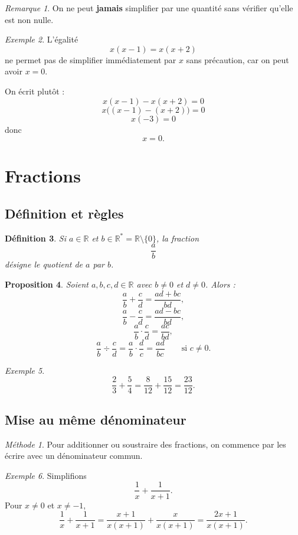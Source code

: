 \documentclass[11pt,a4paper]{article}
\newtheorem{definition}{Définition}[section]
\newtheorem{proposition}[definition]{Proposition}
\theoremstyle{remark}
\newtheorem{remarque}[definition]{Remarque}
\newtheorem{exemple}[definition]{Exemple}
\newtheorem*{methode}{Méthode}
\newcommand{\R}{\mathbb{R}}
\begin{document}
\begin{remarque}
On ne peut \textbf{jamais} simplifier par une quantité sans vérifier qu’elle est non nulle.
\end{remarque}

\begin{exemple}
L’égalité
\[
x(x-1)=x(x+2)
\]
ne permet pas de simplifier immédiatement par \(x\) sans précaution, car on peut avoir \(x=0\).

On écrit plutôt :
\[
x(x-1)-x(x+2)=0
\]
\[
x\big((x-1)-(x+2)\big)=0
\]
\[
x(-3)=0
\]
donc
\[
x=0.
\]
\end{exemple}

\section{Fractions}

\subsection{Définition et règles}

\begin{definition}
Si \(a\in\R\) et \(b\in\R^\ast=\R\setminus\{0\}\), la fraction
\[
\frac{a}{b}
\]
désigne le quotient de \(a\) par \(b\).
\end{definition}

\begin{proposition}
Soient \(a,b,c,d\in\R\) avec \(b\neq 0\) et \(d\neq 0\). Alors :
\[
\frac{a}{b}+\frac{c}{d}=\frac{ad+bc}{bd},
\]
\[
\frac{a}{b}-\frac{c}{d}=\frac{ad-bc}{bd},
\]
\[
\frac{a}{b}\cdot \frac{c}{d}=\frac{ac}{bd},
\]
\[
\frac{a}{b}\div \frac{c}{d}=\frac{a}{b}\cdot\frac{d}{c}=\frac{ad}{bc}
\qquad \text{si } c\neq 0.
\]
\end{proposition}

\begin{exemple}
\[
\frac{2}{3}+\frac{5}{4}=\frac{8}{12}+\frac{15}{12}=\frac{23}{12}.
\]
\end{exemple}

\subsection{Mise au même dénominateur}

\begin{methode}
Pour additionner ou soustraire des fractions, on commence par les écrire avec un dénominateur commun.
\end{methode}

\begin{exemple}
Simplifions
\[
\frac{1}{x}+\frac{1}{x+1}.
\]
Pour \(x\neq 0\) et \(x\neq -1\),
\[
\frac{1}{x}+\frac{1}{x+1}
=
\frac{x+1}{x(x+1)}+\frac{x}{x(x+1)}
=
\frac{2x+1}{x(x+1)}.
\]
\end{exemple}
\end{document}
